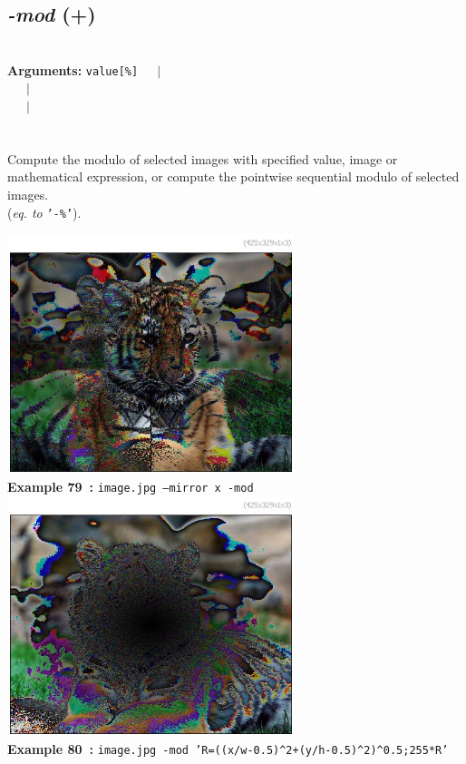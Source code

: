 \documentclass[a4paper,11pt,twoside]{book}
\begin{document}
\subsection{\emph{-mod} (+)}\vspace*{-0.5em}
~\\\textbf{Arguments: } 
{\small \texttt{value[\%]}}~~~$|$\\
\hspace*{2.2cm}{\small \texttt{[image]}}~~~$|$\\
~~~$|$\\
\\~\\
Compute the modulo of selected images with specified value, image or mathematical
expression, or compute the pointwise sequential modulo of selected images.
~\\(\emph{eq. to} {\small \texttt{'-\%'}}).
\begin{center}\includegraphics[keepaspectratio=true,height=7cm,width=\textwidth]{img/gmic_def79.jpg}\\
{\footnotesize \textbf{Example 79~:} \texttt{image.jpg --mirror x -mod}}
\\\includegraphics[keepaspectratio=true,height=7cm,width=\textwidth]{img/gmic_def80.jpg}\\
{\footnotesize \textbf{Example 80~:} \texttt{image.jpg -mod 'R=((x/w-0.5)\textasciicircum 2+(y/h-0.5)\textasciicircum 2)\textasciicircum 0.5;255*R'}}
\end{center}
\end{document}
